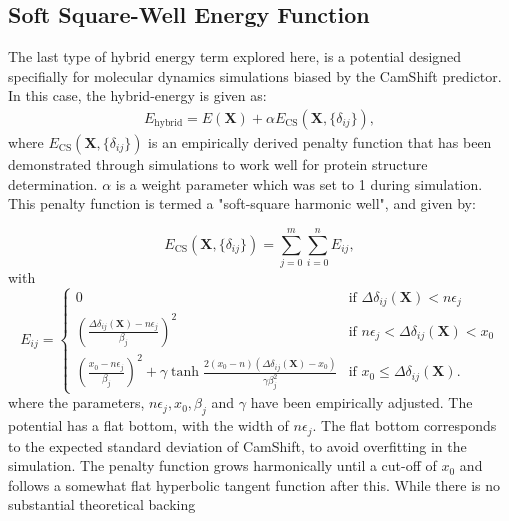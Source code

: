 \subsection{Soft Square-Well Energy Function}
The last type of hybrid energy term explored here, is a potential designed specifially for molecular dynamics simulations biased by the CamShift predictor. \cite{robustelli2009, CSMD}
In this case, the hybrid-energy is given as:
\begin{eqnarray}
    E_{\mathrm{hybrid}}
    = E(\mathbf X) + \alpha E_{\mathrm{CS}}(\mathbf X, \{\delta_{ij}\}),
\end{eqnarray}
where $E_{\mathrm{CS}}(\mathbf X, \{\delta_{ij}\})$ is an empirically derived penalty function that has been demonstrated through simulations to work well for protein structure determination.
$\alpha$ is a weight parameter which was set to 1 during simulation.
This penalty function is termed a "soft-square harmonic well", and given by:


\begin{equation}
    E_{\mathrm{CS}}(\mathbf X, \{\delta_{ij}\}) = \sum_{j=0}^{m} \sum_{i=0}^{n} E_{ij},
\end{equation}
with 
\begin{equation}
    E_{ij} = \begin{cases} 
        0
                & \mbox{if }  \Delta\delta_{ij}(\mathbf X) < n\epsilon_j\\ 
        \left( \frac{\Delta\delta_{ij}(\mathbf X) - n \epsilon_j}{\beta_j}\right)^2
                & \mbox{if }  n\epsilon_j < \Delta\delta_{ij}(\mathbf X) < x_0 \\ 
        \left( \frac{x_0- n \epsilon_j}{\beta_j}\right)^2 + \gamma \tanh{
            \frac{2(x_0- n)(\Delta\delta_{ij}(\mathbf X) - x_0)}{\gamma\beta_j^2}
        }
                & \mbox{if }  x_0 \leq \Delta\delta_{ij}(\mathbf X) .
    \end{cases}
\end{equation}
where the parameters, $n\epsilon_j, x_0, \beta_j$ and $\gamma$ have been empirically adjusted.
The potential has a flat bottom, with the width of $n\epsilon_j$.
The flat bottom corresponds to the expected standard deviation of CamShift, to avoid overfitting in the simulation.
The penalty function grows harmonically until a cut-off of $x_0$ and follows a somewhat flat hyperbolic tangent function after this.
While there is no substantial theoretical backing







